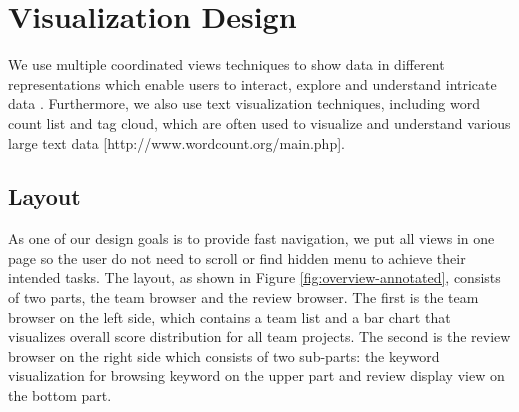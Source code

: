 \documentclass{sigchi}
\begin{document}
\section{Visualization Design}
We use multiple coordinated views techniques to show data in different representations which enable users to interact, explore and understand intricate data \cite{State-of-the-art}. Furthermore, we also use text visualization techniques, including word count list and tag cloud, which are often used to visualize and understand various large text data \cite{TagClouds} [http://www.wordcount.org/main.php].

\subsection{Layout}
As one of our design goals is to provide fast navigation, we put all views in one page
so the user do not need to scroll or find hidden menu to achieve their intended tasks.
The layout, as shown in Figure \ref{fig:overview-annotated}, consists of two
parts, the team browser and the review browser.  The first is the team browser
on the left side, which contains a team list and a bar chart that visualizes
overall score distribution for all team projects. The second is the review
browser on the right side which consists of two sub-parts: the keyword
visualization for browsing keyword on the upper part and review display view on
the bottom part.
\end{document}
